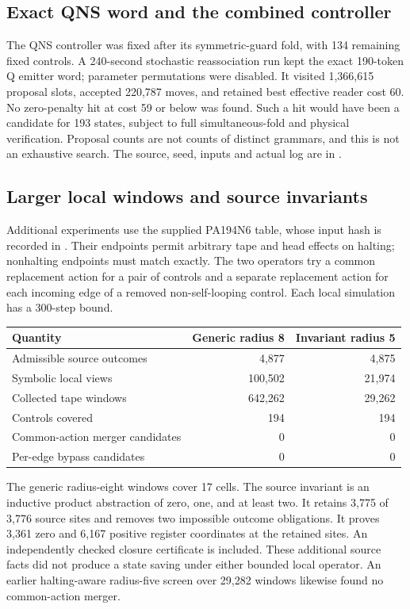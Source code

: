 \subsection{Exact QNS word and the combined controller}
The QNS controller was fixed after its symmetric-guard fold, with 134
remaining fixed controls. A 240-second stochastic reassociation run kept
the exact 190-token Q emitter word; parameter permutations were disabled.
It visited 1,366,615 proposal slots, accepted 220,787 moves, and retained
best effective reader cost 60. No zero-penalty hit at cost 59 or below was
found. Such a hit would have been a candidate for 193 states, subject to
full simultaneous-fold and physical verification. Proposal counts are not
counts of distinct grammars, and this is not an exhaustive search.
The source, seed, inputs and actual log are in
.

\subsection{Larger local windows and source invariants}
Additional experiments use the supplied PA194N6 table, whose input hash
is recorded in .
Their endpoints permit arbitrary tape and head effects on halting;
nonhalting endpoints must match exactly. The two operators try a common
replacement action for a pair of controls and a separate replacement
action for each incoming edge of a removed non-self-looping control.
Each local simulation has a 300-step bound.

\begin{center}\small
\begin{tabular}{lrr}
\toprule Quantity & Generic radius 8 & Invariant radius 5\\\midrule
Admissible source outcomes & 4,877 & 4,875\\
Symbolic local views & 100,502 & 21,974\\
Collected tape windows & 642,262 & 29,262\\
Controls covered & 194 & 194\\
Common-action merger candidates & 0 & 0\\
Per-edge bypass candidates & 0 & 0\\
\bottomrule\end{tabular}\end{center}
The generic radius-eight windows cover 17 cells. The source invariant is
an inductive product abstraction of zero, one, and at least two. It
retains 3,775 of 3,776 source sites and removes two impossible outcome
obligations. It proves 3,361 zero and 6,167 positive register coordinates
at the retained sites. An independently checked closure certificate is
included. These additional source facts did not produce a state saving
under either bounded local operator. An earlier halting-aware radius-five
screen over 29,282 windows likewise found no common-action merger.

